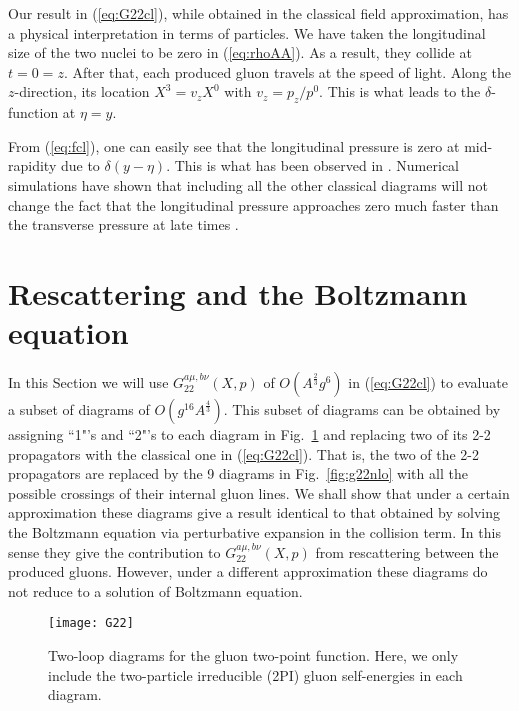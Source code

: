 \documentclass[onecolumn,showpacs,nobibnotes,nofootinbib,12pt,aps,prd,showpacs,notitlepage,nofootinbib,preprintnumbers,amsmath,amssymb]{article}
\def\fig#1{{Fig.~\ref{#1}}}
\begin{document}
Our result in (\ref{eq:G22cl}), while obtained in the classical field
approximation, has a physical interpretation in terms of particles. We
have taken the longitudinal size of the two nuclei to be zero in
(\ref{eq:rhoAA}). As a result, they collide at $t=0=z$. After that,
each produced gluon travels at the speed of light. Along the
$z$-direction, its location $X^3=v_z X^0$ with $v_z=p_z/p^0$. This is
what leads to the $\delta$-function at $\eta=y$.

From (\ref{eq:fcl}), one can easily see that the longitudinal pressure
is zero at mid-rapidity due to $\delta(y-\eta)$. This is what has been
observed in \cite{Kovchegov:2005ss}. Numerical simulations have shown
that including all the other classical diagrams will not change the
fact that the longitudinal pressure approaches zero much faster than
the transverse pressure at late times
\cite{Krasnitz:1998ns,Krasnitz:1999wc,Krasnitz:2003nv,Lappi:2003bi,Berges:2013fga}.




\section{Rescattering and the Boltzmann equation}
\label{sec:resc}

In this Section we will use $G_{22}^{a\mu,b\nu}(X,p)$ of
$O(A^{\frac{2}{3}} g^6)$ in (\ref{eq:G22cl}) to evaluate a subset of
diagrams of $O(g^{16} A^{\frac{4}{3}})$. This subset of diagrams can
be obtained by assigning ``1"'s and ``2"'s to each diagram in
\fig{fig:g22} and replacing two of its 2-2 propagators with the
classical one in (\ref{eq:G22cl}). That is, the two of the 2-2
propagators are replaced by the 9 diagrams in \fig{fig:g22nlo} with
all the possible crossings of their internal gluon lines. We shall
show that under a certain approximation these diagrams give a result
identical to that obtained by solving the Boltzmann equation via
perturbative expansion in the collision term. In this sense they give
the contribution to $G_{22}^{a\mu,b\nu}(X,p)$ from rescattering
between the produced gluons. However, under a different approximation
these diagrams do not reduce to a solution of Boltzmann equation.

\begin{figure}[htb]
\begin{center}
\texttt{[image: G22]}
\end{center}
\caption[*]{Two-loop diagrams for the gluon two-point function. Here,
  we only include the two-particle irreducible (2PI) gluon
  self-energies in each diagram.}
\label{fig:g22}
\end{figure}
\end{document}
